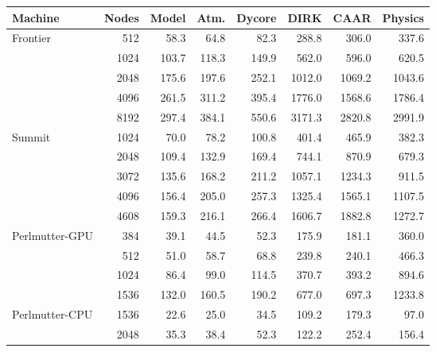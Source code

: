 \begin{tabular}{lr|rrrrrr}
Machine & Nodes & Model & Atm. & Dycore & DIRK & CAAR & Physics \\
\hline
Frontier & 512 & 58.3 & 64.8 & 82.3 & 288.8 & 306.0 & 337.6 \\
 & 1024 & 103.7 & 118.3 & 149.9 & 562.0 & 596.0 & 620.5 \\
 & 2048 & 175.6 & 197.6 & 252.1 & 1012.0 & 1069.2 & 1043.6 \\
 & 4096 & 261.5 & 311.2 & 395.4 & 1776.0 & 1568.6 & 1786.4 \\
 & 8192 & 297.4 & 384.1 & 550.6 & 3171.3 & 2820.8 & 2991.9 \\
\hline
Summit & 1024 & 70.0 & 78.2 & 100.8 & 401.4 & 465.9 & 382.3 \\
 & 2048 & 109.4 & 132.9 & 169.4 & 744.1 & 870.9 & 679.3 \\
 & 3072 & 135.6 & 168.2 & 211.2 & 1057.1 & 1234.3 & 911.5 \\
 & 4096 & 156.4 & 205.0 & 257.3 & 1325.4 & 1565.1 & 1107.5 \\
 & 4608 & 159.3 & 216.1 & 266.4 & 1606.7 & 1882.8 & 1272.7 \\
\hline
Perlmutter-GPU & 384 & 39.1 & 44.5 & 52.3 & 175.9 & 181.1 & 360.0 \\
 & 512 & 51.0 & 58.7 & 68.8 & 239.8 & 240.1 & 466.3 \\
 & 1024 & 86.4 & 99.0 & 114.5 & 370.7 & 393.2 & 894.6 \\
 & 1536 & 132.0 & 160.5 & 190.2 & 677.0 & 697.3 & 1233.8 \\
\hline
Perlmutter-CPU & 1536 & 22.6 & 25.0 & 34.5 & 109.2 & 179.3 & 97.0 \\
 & 2048 & 35.3 & 38.4 & 52.3 & 122.2 & 252.4 & 156.4 \\
\end{tabular}
